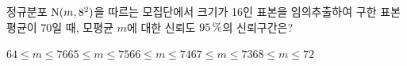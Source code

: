 정규분포 $\mathrm{N}(m{,}\mkern3mu\mathopen{}8^2)$을 따르는 모집단에서 크기가 16인 표본을 임의추출하여 구한 표본평균이 70일 때, 모평균 $m$에 대한 신뢰도 $95\mkern3mu \%$의 신뢰구간은? 
\begin{choicesii}{$64\le m\le 76$}{$65\le m\le 75$}{$66\le m\le 74$}{$67\le m\le 73$}{$68\le m\le 72$}\end{choicesii}
